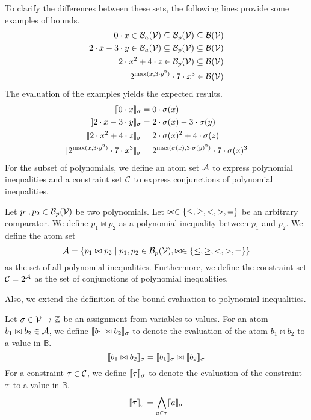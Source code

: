 To clarify the differences between these sets, the following lines provide some examples of bounds.
\begin{align*}
  0 \cdot x \in \mathcal{B}_a(\mathcal{V}) \subseteq \mathcal{B}_p(\mathcal{V}) \subseteq \mathcal{B}(\mathcal{V}) \\
  2 \cdot x - 3 \cdot y \in \mathcal{B}_a(\mathcal{V}) \subseteq \mathcal{B}_p(\mathcal{V}) \subseteq \mathcal{B}(\mathcal{V}) \\
  2 \cdot x^2 + 4 \cdot z \in \mathcal{B}_p(\mathcal{V}) \subseteq \mathcal{B}(\mathcal{V}) \\
  2^{\max(x,3 \cdot y^2)} \cdot 7 \cdot x^3 \in \mathcal{B}(\mathcal{V})
\end{align*}
The evaluation of the examples yields the expected results.
\begin{align*}
  \llbracket 0 \cdot x \rrbracket_{\sigma} &= 0 \cdot \sigma(x) \\
  \llbracket 2 \cdot x - 3 \cdot y \rrbracket_{\sigma} &= 2 \cdot \sigma(x) - 3 \cdot \sigma(y) \\
  \llbracket 2 \cdot x^2 + 4 \cdot z \rrbracket_{\sigma} &= 2 \cdot \sigma(x)^2 + 4 \cdot \sigma(z) \\
  \llbracket 2^{\max(x,3 \cdot y^2)} \cdot 7 \cdot x^3 \rrbracket_{\sigma} &= 2^{\max(\sigma(x),3 \cdot \sigma(y)^2)} \cdot 7 \cdot \sigma(x)^3
\end{align*}
For the subset of polynomials, we define an atom set $\mathcal{A}$ to express polynomial inequalities and a constraint set $\mathcal{C}$ to express conjunctions of polynomial inequalities.

\begin{definition}
  Let $p_1, p_2 \in \mathcal{B}_p(\mathcal{V})$ be two polynomials.
  Let $\bowtie \in \lbrace \leq, \geq, <, >, = \rbrace$ be an arbitrary comparator.
  We define $p_1 \bowtie p_2$ as a polynomial inequality between $p_1$ and $p_2$.
  We define the atom set
  \[ \mathcal{A} = \left\{ p_1 \bowtie p_2 \mid p_1, p_2 \in \mathcal{B}_p(\mathcal{V}), \bowtie \in \lbrace \leq, \geq, <, >, = \rbrace \right\} \]
  as the set of all polynomial inequalities.
  Furthermore, we define the constraint set $\mathcal{C} = 2^{\mathcal{A}}$ as the set of conjunctions of polynomial inequalities.
\end{definition}
Also, we extend the definition of the bound evaluation to polynomial inequalities.

\begin{definition}
  Let $\sigma \in \mathcal{V} \rightarrow \mathbb{Z}$ be an assignment from variables to values.
  For an atom $b_1 \bowtie b_2 \in \mathcal{A}$, we define $\llbracket b_1 \bowtie b_2 \rrbracket_{\sigma}$ to denote the evaluation of the atom $b_1 \bowtie b_2$ to a value in $\mathbb{B}$.
  \[ \llbracket b_1 \bowtie b_2 \rrbracket_{\sigma} = \llbracket b_1 \rrbracket_{\sigma} \bowtie \llbracket b_2 \rrbracket_{\sigma} \]
  For a constraint $\tau \in \mathcal{C}$, we define $\llbracket \tau \rrbracket_{\sigma}$ to denote the evaluation of the constraint $\tau$ to a value in $\mathbb{B}$.
  \[ \llbracket \tau \rrbracket_{\sigma} = \bigwedge_{a \in \tau} \llbracket a \rrbracket_{\sigma} \]
\end{definition}
